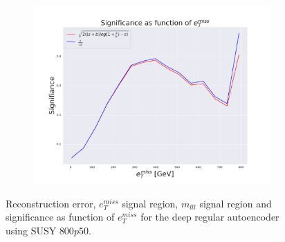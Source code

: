 \begin{figure}[H]
    \begin{subfigure}{.60\textwidth}
        \includegraphics[width=\textwidth]{Figures/AE_testing/big/2lep/significance_etmiss_800p0p050_-1.4833711230716062.pdf}
        \caption{}
        \label{fig:AE_2lep_big_signi_800}
    \end{subfigure}
    \hfill      
    \caption[2lep deep network | $800p50$ | AE]{Reconstruction error, $e_T^{miss}$ signal region, $m_{lll}$ signal region and significance as function of 
    $e_T^{miss}$ for the deep regular autoencoder using SUSY $800p50$.}
    \label{fig:AE_2lep_big_rec_sig_signi_800}
\end{figure}

